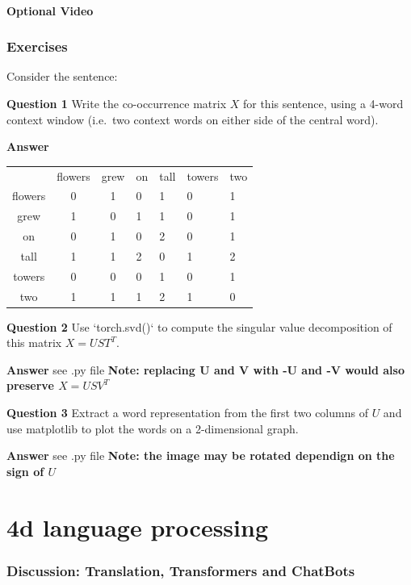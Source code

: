 \documentclass[11pt]{article}
\begin{document}
\subsection{Optional Video}\label{subsec:optional-video4}

\section{Exercises}\label{sec:exercises}
Consider the sentence:

\textbf{Question 1}
Write the co-occurrence matrix $X$ for this sentence, using a 4-word context
window (i.e.\ two context words on either side of the central word).

\textbf{Answer}
\begin{center}
\begin{tabular}{ |c|c|c| }
 \hline
  & flowers & grew & on & tall & towers & two \\
 flowers & 0 & 1 & 0 & 1 & 0 & 1 \\
 grew & 1 & 0 & 1 & 1 & 0 & 1 \\
 on & 0 & 1 & 0 & 2 & 0 & 1 \\
 tall & 1 & 1 & 2 & 0 & 1 & 2 \\
 towers & 0 & 0 & 0 & 1 & 0 & 1 \\
 two & 1 & 1 & 1 & 2 & 1 & 0 \\
 \hline
\end{tabular}
\end{center}

\textbf{Question 2}
Use `torch.svd()` to compute the singular value decomposition of this matrix
$X = UST^T$.

\textbf{Answer}
see .py file
\textbf{Note: replacing U and V with -U and -V would also preserve $X=USV^T$}

\textbf{Question 3}
Extract a word representation from the first two columns of $U$ and use
matplotlib to plot the words on a 2-dimensional graph.

\textbf{Answer}
see .py file
\textbf{Note: the image may be rotated dependign on the sign of $U$}
\part{4d language processing}\label{part:4d-language-processing}

\section{Discussion: Translation, Transformers and ChatBots}\label{sec:discussion:-translation-transformers-and-chatbots}
\end{document}
